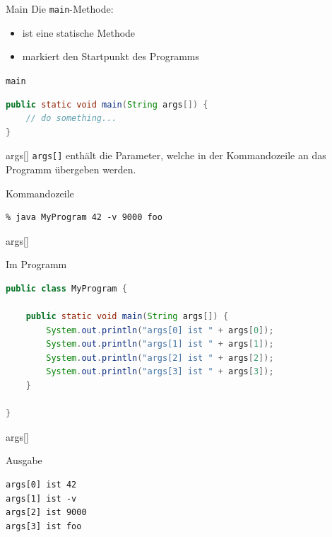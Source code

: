 \documentclass[18pt]{beamer}
\begin{document}
\begin{frame}[fragile]{Main}
    Die \texttt{main}-Methode:
    \begin{itemize}
        \item ist eine statische Methode
        \item markiert den Startpunkt des Programms
    \end{itemize}

    \begin{exampleblock}{\texttt{main}}
        \begin{lstlisting}[language=Java]
public static void main(String args[]) {
    // do something...
}
        \end{lstlisting}

    \end{exampleblock}


\end{frame}

\begin{frame}[fragile]{args[]}
    \texttt{args[]} enthält die Parameter, welche in der Kommandozeile an das Programm übergeben werden.
    \pause
    \begin{exampleblock}{Kommandozeile}
        \begin{lstlisting}
% java MyProgram 42 -v 9000 foo
        \end{lstlisting}
    \end{exampleblock}

\end{frame}

\begin{frame}[fragile]{args[]}

    \begin{exampleblock}{Im Programm}
        \begin{lstlisting}[language=Java]
public class MyProgram {

    public static void main(String args[]) {
        System.out.println("args[0] ist " + args[0]);
        System.out.println("args[1] ist " + args[1]);
        System.out.println("args[2] ist " + args[2]);
        System.out.println("args[3] ist " + args[3]);
    }

}
        \end{lstlisting}
    \end{exampleblock}

\end{frame}

\begin{frame}[fragile]{args[]}

    \begin{exampleblock}{Ausgabe}
        \begin{lstlisting}
args[0] ist 42
args[1] ist -v
args[2] ist 9000
args[3] ist foo
        \end{lstlisting}
    \end{exampleblock}

\end{frame}
\end{document}
